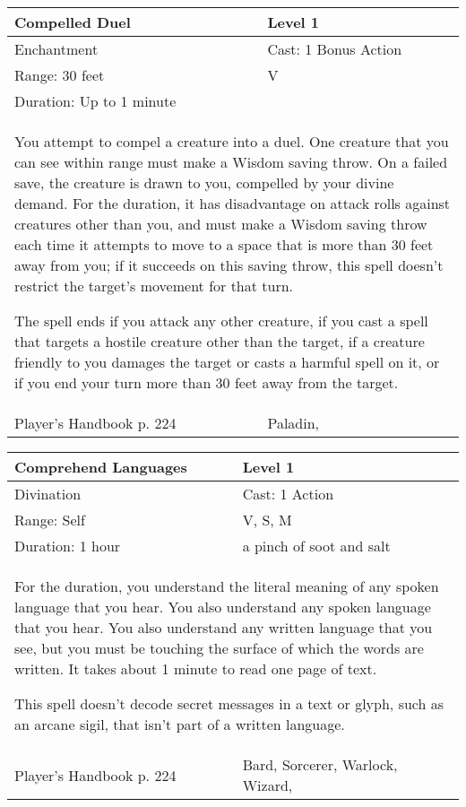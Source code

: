 \documentclass[11pt]{report}
\begin{document}
\begin{table}[H]
	\begin{tabular}{||p{6cm}|p{6cm}||}
		\hline\hline
		\bf{Compelled Duel} & Level 1\\ \hline
		Enchantment & Cast: 1 Bonus Action\\ \hline
		Range: 30 feet & V\\ \hline
		Duration: Up to 1 minute & \\ \hline
		\multicolumn{2}{||p{12cm}||}{You attempt to compel a creature into a duel. 
One creature that you can see within range must make a Wisdom saving throw. On a failed save, the creature is drawn to you, compelled by your divine demand. For the duration, it has disadvantage on attack rolls against creatures other than you, and must make a Wisdom saving throw each time it attempts to move to a space that is more than 30 feet away from you; if it succeeds on this saving throw, this spell doesn’t restrict the target’s movement for that turn. 

The spell ends if you attack any other creature, if you cast a spell that targets a hostile creature other than the target, if a creature friendly to you damages the target or casts a harmful spell on it, or if you end your turn more than 30 feet away from the target.}\\ \hline
Player's Handbook p. 224 & Paladin, \\ \hline\hline
	\end{tabular}
\end{table}

\begin{table}[H]
	\begin{tabular}{||p{6cm}|p{6cm}||}
		\hline\hline
		\bf{Comprehend Languages} & Level 1\\ \hline
		Divination & Cast: 1 Action\\ \hline
		Range: Self & V, S, M \\ \hline
		Duration: 1 hour & a pinch of soot and salt\\ \hline
		\multicolumn{2}{||p{12cm}||}{For the duration, you understand the literal meaning of any spoken language that you hear. 
You also understand any spoken language that you hear. You also understand any written language that you see, but you must be touching the surface of which the words are written. It takes about 1 minute to read one page of text. 

This spell doesn’t decode secret messages in a text or glyph, such as an arcane sigil, that isn’t part of a written language.}\\ \hline
Player's Handbook p. 224 & Bard, Sorcerer, Warlock, Wizard, \\ \hline\hline
	\end{tabular}
\end{table}
\end{document}
